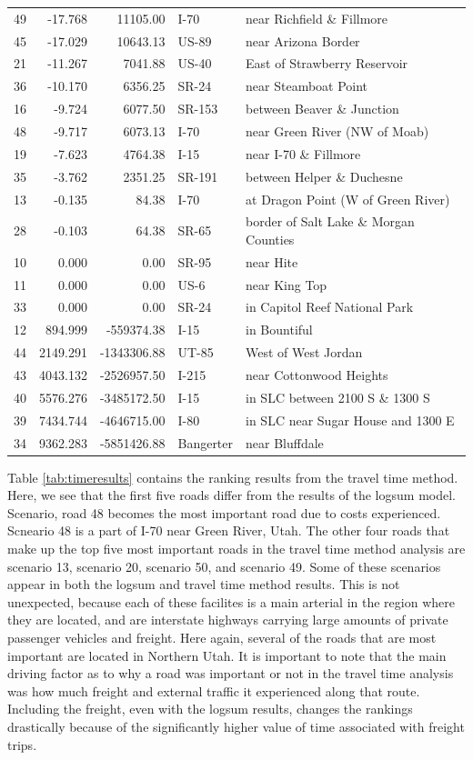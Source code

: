 \begin{table}
\begin{tabular}[t]{crrll}
49 & -17.768 & 11105.00 & I-70 & near Richfield \& Fillmore\\
45 & -17.029 & 10643.13 & US-89 & near Arizona Border\\
21 & -11.267 & 7041.88 & US-40 & East of Strawberry Reservoir\\
36 & -10.170 & 6356.25 & SR-24 & near Steamboat Point\\
16 & -9.724 & 6077.50 & SR-153 & between Beaver \& Junction\\
48 & -9.717 & 6073.13 & I-70 & near Green River (NW of Moab)\\
19 & -7.623 & 4764.38 & I-15 & near I-70 \& Fillmore\\
35 & -3.762 & 2351.25 & SR-191 & between Helper \& Duchesne\\
13 & -0.135 & 84.38 & I-70 & at Dragon Point (W of Green River)\\
28 & -0.103 & 64.38 & SR-65 & border of Salt Lake \& Morgan Counties\\
10 & 0.000 & 0.00 & SR-95 & near Hite\\
11 & 0.000 & 0.00 & US-6 & near King Top\\
33 & 0.000 & 0.00 & SR-24 & in Capitol Reef National Park\\
12 & 894.999 & -559374.38 & I-15 & in Bountiful\\
44 & 2149.291 & -1343306.88 & UT-85 & West of West Jordan\\
43 & 4043.132 & -2526957.50 & I-215 & near Cottonwood Heights\\
40 & 5576.276 & -3485172.50 & I-15 & in SLC between 2100 S \& 1300 S\\
39 & 7434.744 & -4646715.00 & I-80 & in SLC near Sugar House and 1300 E\\
34 & 9362.283 & -5851426.88 & Bangerter & near Bluffdale\\
\bottomrule
\end{tabular}
\end{table}

Table \ref{tab:timeresults} contains the ranking results from the travel
time method. Here, we see that the first five roads differ from the
results of the logsum model. Scenario, road 48 becomes the most important
road due to costs experienced. Scneario 48 is a part of I-70 near Green River,
Utah. The other four roads that make up the top five most important roads
in the travel time method analysis are scenario 13, scenario 20, scenario 50, and scenario
49. Some of these scenarios appear in both the logsum and travel time method results. This is not unexpected, because each of these facilites is a main arterial in the region where they are located, and are interstate highways carrying large amounts of private passenger vehicles and freight.
Here again, several of the roads that are most important are located in
Northern Utah. It is important to note that the main driving factor as to
why a road was important or not in the travel time analysis was how much
freight and external traffic it experienced along that route. Including
the freight, even with the logsum results, changes the rankings
drastically because of the significantly higher value of time associated
with freight trips.


